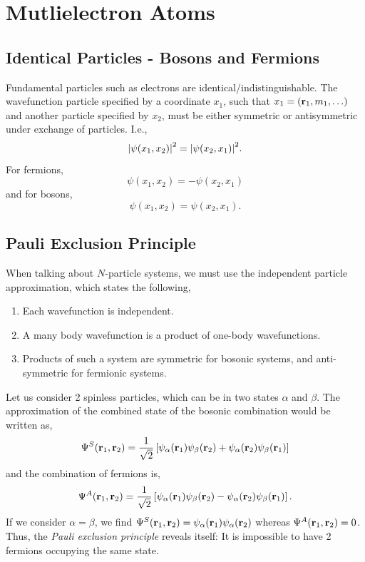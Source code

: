 \documentclass{book}
\begin{document}
\chapter{Mutlielectron Atoms}
\section{Identical Particles - Bosons and Fermions}
Fundamental particles such as electrons are identical/indistinguishable. The wavefunction particle specified by a coordinate $x_1$, such that $x_1 = (\vb{r}_1, m_1, \ldots)$ and another particle specified by $x_2$, must be either symmetric or antisymmetric under exchange of particles. I.e.,
\begin{equation}
	\abs{\psi(x_1, x_2)}^2 = \abs{\psi(x_2,x_1)}^2.
\end{equation}
For fermions,
\begin{equation}
	\psi(x_1,x_2) = - \psi(x_2,x_1)
\end{equation}
and for bosons,
\begin{equation}
	\psi(x_1,x_2) = \psi(x_2,x_1).
\end{equation}
\section{Pauli Exclusion Principle}
When talking about $N$-particle systems, we must use the independent particle approximation, which states the following,
\begin{enumerate}
	\item Each wavefunction is independent.
	\item A many body wavefunction is a product of one-body wavefunctions.
	\item Products of such a system are symmetric for bosonic systems, and anti-symmetric for fermionic systems.
\end{enumerate}
Let us consider 2 spinless particles, which can be in two states $\alpha$ and $\beta$. The approximation of the combined state of the bosonic combination would be written as,
\begin{equation}
	\Psi^S(\vb{r}_1,\vb{r}_2) = \frac{1}{\sqrt{2}}\left[\psi_{\alpha}(\vb{r}_1)\psi_{\beta}(\vb{r}_2) + \psi_{\alpha}(\vb{r}_2)\psi_{\beta}(\vb{r}_1)\right]
\end{equation}
and the combination of fermions is,
\begin{equation}
	\Psi^A(\vb{r}_1,\vb{r}_2) = \frac{1}{\sqrt{2}}\left[\psi_{\alpha}(\vb{r}_1)\psi_{\beta}(\vb{r}_2) - \psi_{\alpha}(\vb{r}_2)\psi_{\beta}(\vb{r}_1)\right].
\end{equation}
If we consider $\alpha = \beta$, we find $\Psi^S(\vb{r}_1,\vb{r}_2) = \psi_{\alpha}(\vb{r}_1)\psi_{\alpha}(\vb{r}_2)$ whereas $\Psi^A(\vb{r}_1,\vb{r}_2) = 0$. Thus, the \textit{Pauli exclusion principle} reveals itself: It is impossible to have 2 fermions occupying the same state.
\end{document}
